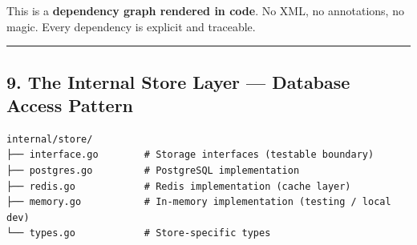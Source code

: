 \documentclass[11pt,openany]{book}
\begin{document}
This is a \textbf{dependency graph rendered in code}. No XML, no
annotations, no magic. Every dependency is explicit and traceable.

\begin{center}\rule{0.5\linewidth}{0.5pt}\end{center}

\hypertarget{the-internal-store-layer-database-access-pattern}{%
\subsection{9. The Internal Store Layer --- Database Access
Pattern}\label{the-internal-store-layer-database-access-pattern}}

\begin{verbatim}
internal/store/
├── interface.go        # Storage interfaces (testable boundary)
├── postgres.go         # PostgreSQL implementation
├── redis.go            # Redis implementation (cache layer)
├── memory.go           # In-memory implementation (testing / local dev)
└── types.go            # Store-specific types
\end{verbatim}
\end{document}
